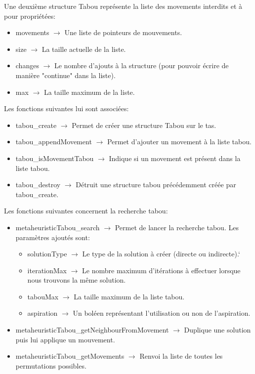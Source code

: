 \documentclass{EPUProjetPeiP}
\begin{document}
Une deuxième structure Tabou représente la liste des movements interdits et à pour propriétées:
\begin{itemize}
	\item movements $\longrightarrow$ Une liste de pointeurs de mouvements.
	\item size $\longrightarrow$ La taille actuelle de la liste.
	\item changes $\longrightarrow$ Le nombre d'ajouts à la structure (pour pouvoir écrire de manière "continue" dans la liste).
	\item max $\longrightarrow$ La taille maximum de la liste.\\
\end{itemize}

Les fonctions suivantes lui sont associées:
\begin{itemize}
	\item tabou\_create $\longrightarrow$ Permet de créer une structure Tabou sur le tas.
	\item tabou\_appendMovement $\longrightarrow$ Permet d'ajouter un movement à la liste tabou.
	\item tabou\_isMovementTabou $\longrightarrow$ Indique si un movement est présent dans la liste tabou.
	\item tabou\_destroy $\longrightarrow$ Détruit une structure tabou précédemment créée par tabou\_create.\\
\end{itemize}

Les fonctions suivantes concernent la recherche tabou:
\begin{itemize}
	\item metaheuristicTabou\_search $\longrightarrow$ Permet de lancer la recherche tabou. Les paramètres ajoutés sont:
	\begin{itemize}
		\item solutionType $\longrightarrow$ Le type de la solution à créer (directe ou indirecte).`
		\item iterationMax $\longrightarrow$ Le nombre maximum d'itérations à effectuer lorsque nous trouvons la même solution.
		\item tabouMax $\longrightarrow$ La taille maximum de la liste tabou.
		\item aspiration $\longrightarrow$ Un boléen représentant l'utilisation ou non de l'aspiration.
	\end{itemize}
	\item metaheuristicTabou\_getNeighbourFromMovement $\longrightarrow$ Duplique une solution puis lui applique un mouvement.
	\item metaheuristicTabou\_getMovements $\longrightarrow$ Renvoi la liste de toutes les permutations possibles.
\end{itemize}
\end{document}
